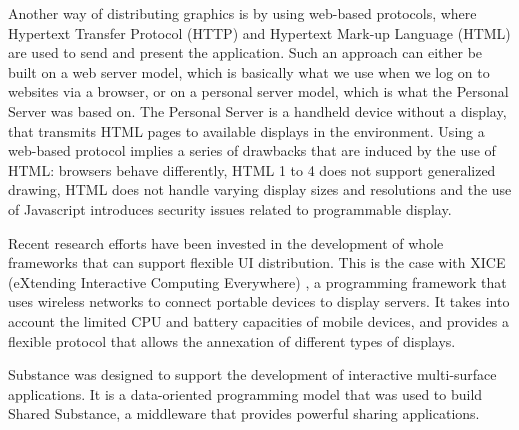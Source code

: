 Another way of distributing graphics is by using web-based protocols, where Hypertext Transfer Protocol (HTTP) and Hypertext Mark-up Language (HTML) are used to send and present the application.
Such an approach can either be built on a web server model, which is basically what we use when we log on to websites via a browser, or on a personal server model, which is what the Personal Server \citep{Want:2002:personalserver} was based on.
The Personal Server is a handheld device without a display, that transmits HTML pages to available displays in the environment.
Using a web-based protocol implies a series of drawbacks that are induced by the use of HTML: browsers behave differently, HTML 1 to 4 does not support generalized drawing, HTML does not handle varying display sizes and resolutions and the use of Javascript introduces security issues related to programmable display.

Recent research efforts have been invested in the development of whole frameworks that can support flexible UI distribution.
This is the case with XICE (eXtending Interactive Computing Everywhere) \citep{Arthur:2011:xice}, a programming framework that uses wireless networks to connect portable devices to display servers.
It takes into account the limited CPU and battery capacities of mobile devices, and provides a flexible protocol that allows the annexation of different types of displays.

Substance \citep{Gjerlufsen:2011:substance} was designed to support the development of interactive multi-surface applications.
It is a data-oriented programming model that was used to build Shared Substance, a middleware that provides powerful sharing applications.




